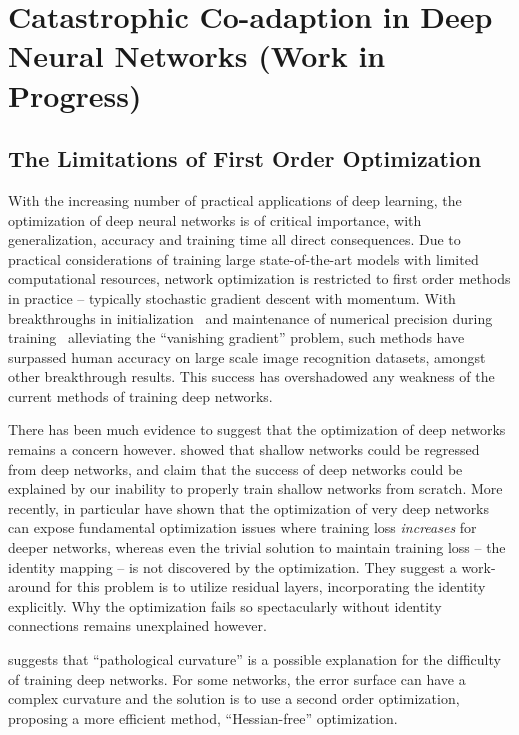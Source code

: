 \documentclass[thesis]{subfiles}
\begin{document}
    
    \chapter{Catastrophic Co-adaption in Deep Neural Networks (Work in Progress)}
    \label{pairablation}

\section{The Limitations of First Order Optimization}
With the increasing number of practical applications of deep learning, the optimization of deep neural networks is of critical importance, with generalization, accuracy and training time all direct consequences. Due to practical considerations of training large state-of-the-art models with limited computational resources, network optimization is restricted to first order methods in practice -- typically stochastic gradient descent with momentum. With breakthroughs in initialization~\citep{glorot2010understanding,He2015b} and maintenance of numerical precision during training~\citep{Ioffe2015} alleviating the ``vanishing gradient'' problem, such methods have surpassed human accuracy on large scale image recognition datasets, amongst other breakthrough results. This success has overshadowed any weakness of the current methods of training deep networks.

There has been much evidence to suggest that the optimization of deep networks remains a concern however. \citet{Ba2013dothey} showed that shallow networks could be regressed from deep networks, and claim that the success of deep networks could be explained by our inability to properly train shallow networks from scratch. More recently, \citet{He2015,He2016} in particular have shown that the optimization of very deep networks can expose fundamental optimization issues where training loss \emph{increases} for deeper networks, whereas even the trivial solution to maintain training loss -- the identity mapping -- is not discovered by the optimization. They suggest a work-around for this problem is to utilize residual layers, incorporating the identity explicitly. Why the optimization fails so spectacularly without identity connections remains unexplained however.

\citet{martens2010deep} suggests that ``pathological curvature'' is a possible explanation for the difficulty of training deep networks. For some networks, the error surface can have a complex curvature  and the solution is to use a second order optimization, proposing a more efficient method, ``Hessian-free'' optimization.
\end{document}

